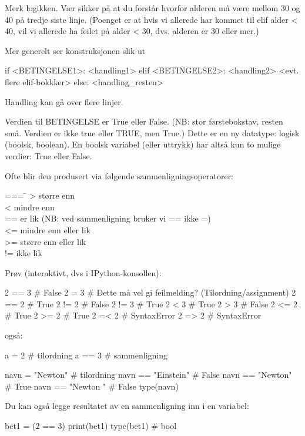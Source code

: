 {Merk logikken. Vær sikker på at du forstår hvorfor alderen må være mellom 30 og 40 på tredje siste linje. (Poenget er at hvis vi allerede har kommet til elif alder < 40, vil vi allerede ha feilet på alder < 30, dvs. alderen er 30 eller mer.) 

Mer generelt ser konstruksjonen slik ut

\begin{usncodebox}
if <BETINGELSE1>: 
   <handling1>
elif <BETINGELSE2>: 
   <handling2>
<evt. flere elif-bokkker>
else: 
   <handling_resten>
\end{usncodebox}

Handling kan gå over flere linjer. 

Verdien til BETINGELSE er True eller False. (NB: stor førstebokstav, resten små. Verdien er ikke true eller TRUE, men True.) Dette er en ny datatype: logisk (boolsk, boolean). En boolsk variabel (eller uttrykk) har altså kun to mulige verdier: True eller False. 

Ofte blir den produsert via følgende sammenligningsoperatorer:
\begin{tabbing}
=== \=\kill
>  \> større enn\\
<  \> mindre enn\\
== \> er lik  (NB: ved sammenligning bruker vi == ikke =)\\
<= \> mindre enn eller lik\\
>= \> større enn eller lik\\
!= \> ikke lik
\end{tabbing}

Prøv (interaktivt, dvs i IPython-konsollen):
\begin{usncodebox}
2 == 3   # False
2 = 3    # Dette må vel gi feilmelding? (Tilordning/assignment)
2 == 2   # True
2 != 2   # False
2 != 3   # True
2 < 3    # True
2 > 3    # False
2 <= 2   # True
2 >= 2   # True
2 =< 2   # SyntaxError
2 => 2   # SyntaxError
\end{usncodebox}

også:
\begin{usncodebox}
a = 2    # tilordning
a == 3   # sammenligning

navn = "Newton"       # tilordning
navn == "Einstein"    # False 
navn == "Newton"      # True
navn == "Newton "     # False
type(navn)
\end{usncodebox}

Du kan også legge resultatet av en sammenligning inn i en variabel:
\begin{usncodebox}
bet1 = (2 == 3)   
print(bet1)
type(bet1)   # bool
\end{usncodebox}

}
